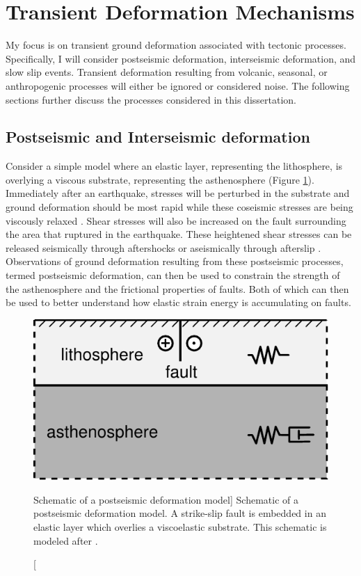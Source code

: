 \section{Transient Deformation Mechanisms}
My focus is on transient ground deformation associated with tectonic
processes. Specifically, I will consider postseismic deformation,
interseismic deformation, and slow slip events. Transient deformation
resulting from volcanic, seasonal, or anthropogenic processes will
either be ignored or considered noise. The following sections further
discuss the processes considered in this dissertation.

\subsection{Postseismic and Interseismic deformation}

Consider a simple model where an elastic layer, representing the
lithosphere, is overlying a viscous substrate, representing the
asthenosphere (Figure \ref{intro:fig:1}). Immediately after an
earthquake, stresses will be perturbed in the substrate and ground
deformation should be most rapid while these coseismic stresses are
being viscously relaxed \citep{Nur1974,Savage1978}. Shear stresses
will also be increased on the fault surrounding the area that ruptured
in the earthquake. These heightened shear stresses can be released
seismically through aftershocks or aseismically through afterslip
\citep{Marone1991}. Observations of ground deformation resulting from
these postseismic processes, termed postseismic deformation, can then
be used to constrain the strength of the asthenosphere and the
frictional properties of faults. Both of which can then be used to
better understand how elastic strain energy is accumulating on faults.

\begin{figure}
\includegraphics{schematic}
\caption
[Schematic of a postseismic deformation model]
{Schematic of a postseismic deformation model. A strike-slip fault is
embedded in an elastic layer which overlies a viscoelastic substrate.
This schematic is modeled after \citep{Savage1978}.}
\label{intro:fig:1}
\end{figure}

